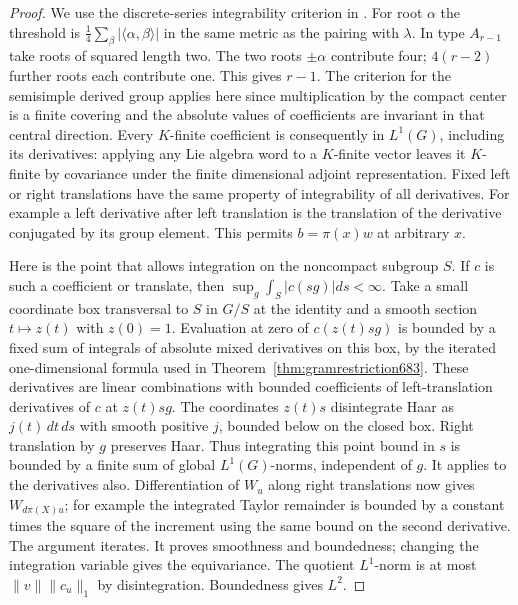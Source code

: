 \documentclass[a4paper,11pt]{article}
\theoremstyle{definition}
\theoremstyle{remark}
\numberwithin{equation}{section}
\begin{document}
\begin{proof}
We use the discrete-series integrability criterion in
\cite{XXV-XX-XX-milicic684}. For root \(\alpha\) the threshold is
\(\tfrac14\sum_{\beta}|\langle\alpha,\beta\rangle|\) in the
same metric as the pairing with \(\lambda\). In type \(A_{r-1}\)
take roots of squared length two. The two roots \(\pm\alpha\)
contribute four; \(4(r-2)\) further roots each contribute one.
This gives \(r-1\). The criterion for the semisimple derived
group applies here since multiplication by the compact center
is a finite covering and the absolute values of coefficients
are invariant in that central direction. Every \(K\)-finite
coefficient is consequently in \(L^1(G)\), including its
derivatives: applying any Lie algebra word to a \(K\)-finite
vector leaves it \(K\)-finite by covariance under the finite
dimensional adjoint representation. Fixed left or right
translations have the same property of integrability of all
derivatives. For example a left derivative after left translation
is the translation of the derivative conjugated by its group
element. This permits \(b=\pi(x)w\) at arbitrary \(x\).

Here is the point that allows integration on the noncompact
subgroup \(S\). If \(c\) is such a coefficient or translate,
then \(\sup_g\int_S|c(sg)|ds<\infty\). Take a small coordinate
box transversal to \(S\) in \(G/S\) at the identity and a smooth
section \(t\mapsto z(t)\) with \(z(0)=1\). Evaluation at zero of
\(c(z(t)sg)\) is bounded by a fixed sum of integrals of absolute
mixed derivatives on this box, by the iterated one-dimensional
formula used in Theorem~\ref{thm:gramrestriction683}. These
derivatives are linear combinations with bounded coefficients
of left-translation derivatives of \(c\) at \(z(t)sg\).
The coordinates \(z(t)s\) disintegrate Haar as \(j(t)\,dt\,ds\)
with smooth positive \(j\), bounded below on the closed box.
Right translation by \(g\) preserves Haar. Thus integrating
this point bound in \(s\) is bounded by a finite sum of global
\(L^1(G)\)-norms, independent of \(g\). It applies to the
derivatives also. Differentiation of \(W_u\) along right
translations now gives \(W_{d\pi(X)u}\); for example the
integrated Taylor remainder is bounded by a constant times
the square of the increment using the same bound on the second
derivative. The argument iterates. It proves smoothness and
boundedness; changing the integration variable gives the
equivariance. The quotient \(L^1\)-norm is at most
\(\|v\|\|c_u\|_1\) by disintegration. Boundedness gives \(L^2\).


\end{proof}
\end{document}
